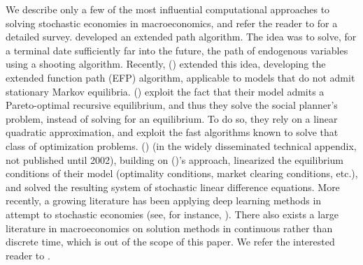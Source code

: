 We describe only a few of the most influential computational approaches to solving stochastic economies in macroeconomics, and refer the reader to \citet{fernandez1016solve} for a detailed survey.
\citeauthor{durbin2012time} \citeyear{durbin2012time} developed an extended path algorithm.
The idea was to solve, for a terminal date sufficiently far into the future, the path of endogenous variables using a shooting algorithm. 
Recently, \citeauthor{maliar2015tractable} (\citeyear{maliar2015tractable}) extended this idea, developing the extended function path (EFP) algorithm, applicable to models that do not admit stationary Markov equilibria.
\citeauthor{kydland1982time} (\citeyear{kydland1982time}) exploit the fact that their model admits a Pareto-optimal recursive equilibrium, and thus they solve the social planner's problem, instead of solving for an equilibrium.
To do so, they rely on a linear quadratic approximation, and exploit the fast algorithms known to solve that class of optimization problems. 
\citeauthor{king2002production} (\citeyear{king2002production}) (in the widely disseminated technical appendix, not published until 2002), building on \citeauthor{blanchard1980solution} (\citeyear{blanchard1980solution})'s approach, linearized the equilibrium conditions of their model (optimality conditions, market clearing conditions, etc.), and solved the resulting system of stochastic linear difference equations.
More recently, a growing literature has been applying deep learning methods in attempt to stochastic economies (see, for instance, \citet{curry2023learning, han2021deepham, childers2022differentiable}).
%
There also exists a large literature in macroeconomics on solution methods in continuous rather than discrete time, which is out of the scope of this paper.
We refer the interested reader to \citet{parra2015solution}.